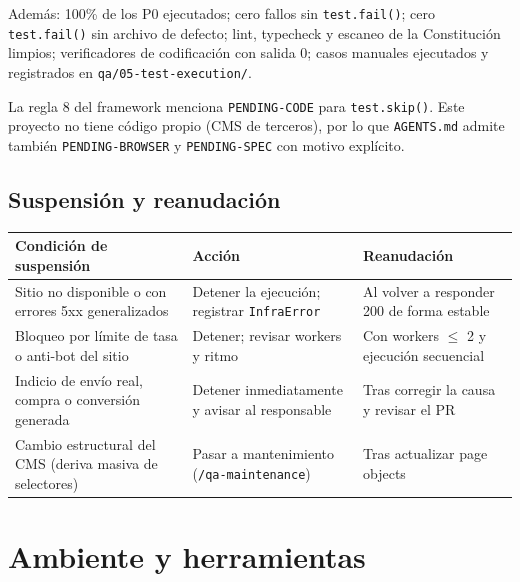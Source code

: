 \documentclass[11pt,a4paper]{article}
\begin{document}
Además: 100\% de los P0 ejecutados; cero fallos sin \texttt{test.fail()}; cero \texttt{test.fail()}
sin archivo de defecto; lint, typecheck y escaneo de la Constitución limpios; verificadores de
codificación con salida 0; casos manuales ejecutados y registrados en \texttt{qa/05-test-execution/}.

\begin{infobox}
La regla 8 del framework menciona \texttt{PENDING-CODE} para \texttt{test.skip()}. Este proyecto no
tiene código propio (CMS de terceros), por lo que \texttt{AGENTS.md} admite también
\texttt{PENDING-BROWSER} y \texttt{PENDING-SPEC} con motivo explícito.
\end{infobox}

\subsection{Suspensión y reanudación}

\begin{table}[H]
\centering\small
\begin{tabularx}{\textwidth}{@{}X X X@{}}
\toprule
Condición de suspensión & Acción & Reanudación \\
\midrule
Sitio no disponible o con errores 5xx generalizados & Detener la ejecución; registrar \texttt{InfraError} & Al volver a responder 200 de forma estable \\
Bloqueo por límite de tasa o anti-bot del sitio & Detener; revisar workers y ritmo & Con workers $\leq$ 2 y ejecución secuencial \\
Indicio de envío real, compra o conversión generada & Detener inmediatamente y avisar al responsable & Tras corregir la causa y revisar el PR \\
Cambio estructural del CMS (deriva masiva de selectores) & Pasar a mantenimiento (\texttt{/qa-maintenance}) & Tras actualizar page objects \\
\bottomrule
\end{tabularx}
\end{table}

\section{Ambiente y herramientas}
\end{document}

